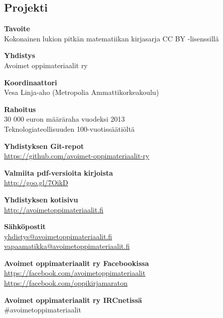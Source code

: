 \subsection*{Projekti}

\textbf{Tavoite} \\
Kokonainen lukion pitkän matematiikan kirjasarja CC BY -lisenssillä

\textbf{Yhdistys} \\
Avoimet oppimateriaalit ry

\textbf{Koordinaattori} \\
Vesa Linja-aho (Metropolia Ammattikorkeakoulu)

\textbf{Rahoitus} \\
30 000 euron määräraha vuodeksi 2013 \\
Teknologiateollisuuden 100-vuotissäätiöltä

\textbf{Yhdistyksen Git-repot} \\
\url{https://github.com/avoimet-oppimateriaalit-ry}

\textbf{Valmiita pdf-versioita kirjoista} \\
\url{http://goo.gl/7OikD}

\textbf{Yhdistyksen kotisivu} \\
\url{http://avoimetoppimateriaalit.fi}

\textbf{Sähköpostit} \\
\href{mailto:yhdistys@avoimetoppimateriaalit.fi}{yhdistys@avoimetoppimateriaalit.fi} \\
\href{mailto:vapaamatikka@avoimetoppimateriaalit.fi}{vapaamatikka@avoimetoppimateriaalit.fi}

\textbf{Avoimet oppimateriaalit ry Facebookissa} \\
\url{https://facebook.com/avoimetoppimateriaalit} \\
\url{https://facebook.com/oppikirjamaraton}

\textbf{Avoimet oppimateriaalit ry IRCnetissä} \\
\#avoimetoppimateriaalit
